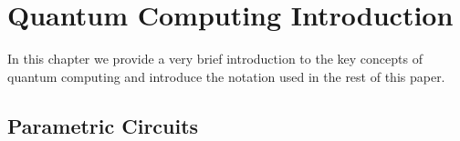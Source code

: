 \chapter{Quantum Computing Introduction}\label{chapter:quantum_mechanic_introduction}

In this chapter we provide a very brief introduction to the key concepts of quantum computing and introduce the notation used in the rest of this paper.

\section{Parametric Circuits}


